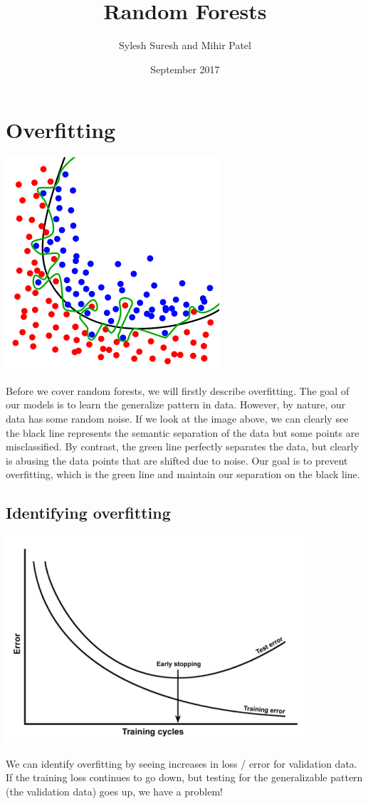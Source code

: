 \documentclass{article}
\title{Random Forests}
\author{Sylesh Suresh and Mihir Patel}
\date{September 2017}
\begin{document}
\maketitle

\section{Overfitting}
\begin{center}
    \includegraphics[scale=0.4]{overfitting.png}
\end{center}
Before we cover random forests, we will firstly describe overfitting. The goal of our models is to learn the generalize pattern in data. However, by nature, our data has some random noise. If we look at the image above, we can clearly see the black line represents the semantic separation of the data but some points are misclassified. By contrast, the green line perfectly separates the data, but clearly is abusing the data points that are shifted due to noise. Our goal is to prevent overfitting, which is the green line and maintain our separation on the black line. 

\subsection{Identifying overfitting}
\begin{center}
    \includegraphics[scale=1.1]{overfittinglines.png}
\end{center}
We can identify overfitting by seeing increases in loss / error for validation data. If the training loss continues to go down, but testing for the generalizable pattern (the validation data) goes up, we have a problem!
\end{document}

